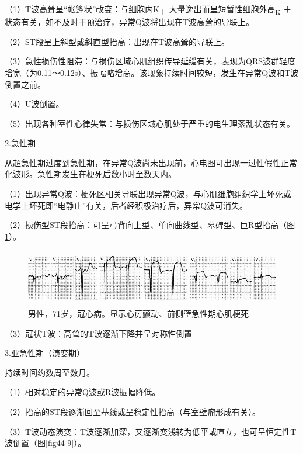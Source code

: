 （1）T波高耸呈“帐篷状”改变：与细胞内K\textsubscript{＋}
大量逸出而呈短暂性细胞外高\textsubscript{K}
＋状态有关，如不及时干预治疗，异常Q波将出现在T波高耸的导联上。

（2）ST段呈上斜型或斜直型抬高：出现在T波高耸的导联上。

（3）急性损伤性阻滞：与损伤区域心肌组织传导延缓有关，表现为QRS波群轻度增宽（为0.11～0.12s）、振幅略增高。该现象持续时间较短，发生在异常Q波和T波倒置之前。

（4）U波倒置。

（5）出现各种室性心律失常：与损伤区域心肌处于严重的电生理紊乱状态有关。

2.急性期

从超急性期过度到急性期，在异常Q波尚未出现前，心电图可出现一过性假性正常化波形。急性期发生在梗死后数小时至数天内。

（1）出现异常Q波：梗死区相关导联出现异常Q波，与心肌细胞组织学上坏死或电学上坏死即“电静止”有关，后者经积极治疗后，异常Q波可消失。

（2）损伤型ST段抬高：可呈弓背向上型、单向曲线型、墓碑型、巨R型抬高（图\ref{fig44-8}）。

\begin{figure}[!htbp]
 \centering
 \includegraphics[width=5.58333in,height=0.97917in]{./images/Image00716.jpg}
 \captionsetup{justification=centering}
 \caption{男性，71岁，冠心病。显示心房颤动、前侧壁急性期心肌梗死}
 \label{fig44-8}
  \end{figure} 

（3）冠状T波：高耸的T波逐渐下降并呈对称性倒置

3.亚急性期（演变期）

持续时间约数周至数月。

（1）相对稳定的异常Q波或R波振幅降低。

（2）抬高的ST段逐渐回至基线或呈稳定性抬高（与室壁瘤形成有关）。

（3）T波动态演变：T波逐渐加深，又逐渐变浅转为低平或直立，也可呈恒定性T波倒置（图\ref{fig44-9}）。

